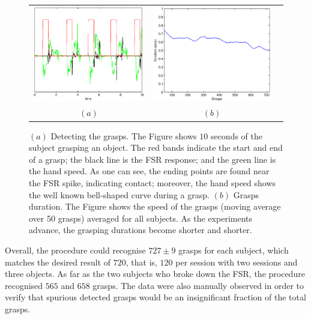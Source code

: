 \begin{figure}[htbp]
  \begin{center}
    \begin{tabular}{ccc}
      \includegraphics[width=0.48\linewidth]{grasp_seq_scotch.eps} &
      \includegraphics[width=0.48\linewidth]{grasp_trend.eps} \\
      $(a)$ & $(b)$
    \end{tabular}
    \caption{$(a)$ Detecting the grasps. The Figure shows $10$ seconds
    of the subject grasping an object. The red bands indicate the
    start and end of a grasp; the black line is the FSR response; and
    the green line is the hand speed. As one can see, the ending
    points are found near the FSR spike, indicating contact; moreover,
    the hand speed shows the well known bell-shaped curve during a
    grasp. $(b)$ Grasps duration. The Figure shows the speed of the grasps
    (moving average over 50 grasps) averaged for all subjects. As the
    experiments advance, the grasping durations become shorter and
    shorter.}
    \label{fig:grasp_sequence}
  \end{center}
\end{figure}

Overall, the procedure could recognise $727 \pm 9$ grasps for each
subject, which matches the desired result of $720$, that is, $120$ per
session with two sessions and three objects. As far as the two
subjects who broke down the FSR, the procedure recognised $565$ and
$658$ grasps. The data were also manually observed in order to verify
that spurious detected grasps would be an insignificant fraction of
the total grasps.

